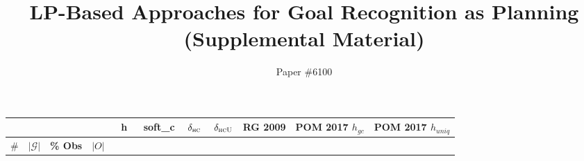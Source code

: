 \documentclass[letterpaper]{article}
\newcommand{\softc}{soft_c}
\newcommand{\hdeltahc}{\ensuremath{\delta_{\textsc{hc}}}}
\newcommand{\hdeltahcu}{\ensuremath{\delta_{\textsc{hcU}}}}
\newcommand{\hvalue}{h}
\newcommand{\rg}{RG 2009}
\newcommand{\uniqueness}{POM 2017 $h_{\mathit{uniq}}$}
\newcommand{\completion}{POM 2017 $h_{\mathit{gc}}$}
\begin{document}
\title{LP-Based Approaches for Goal Recognition as Planning \\ (Supplemental Material)}
\author{
Paper \#6100
}

\maketitle

\begin{table*}[]
\centering
\fontsize{5}{6}\selectfont
\setlength\tabcolsep{2pt}
\begin{tabular}{|c|c|cc|ccc|ccc|ccc|ccc|ccc|ccc|ccc}
\hline
                   &                     
				   & \multicolumn{2}{c|}{} 
				   & \multicolumn{3}{c|}{\hvalue}
				   & \multicolumn{3}{c|}{\softc}
				   & \multicolumn{3}{c|}{\hdeltahc}
				   & \multicolumn{3}{c|}{\hdeltahcu}
				   & \multicolumn{3}{c|}{\rg}
				   & \multicolumn{3}{c|}{\completion}
				   & \multicolumn{3}{c|}{\uniqueness}
				   \\ \hline
\#                 
& $|\mathcal{G}|$                   
& \textbf{\% Obs}        
& $|O|$


\end{tabular}
\end{table*}
\end{document}
